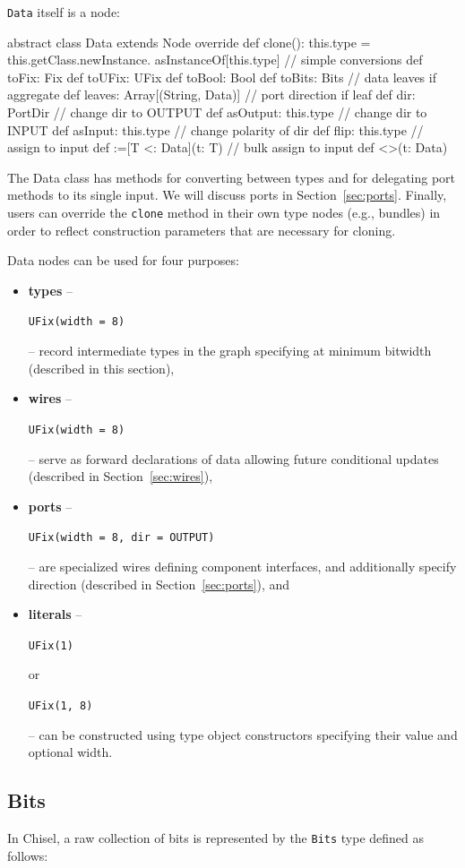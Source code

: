 \documentclass[10pt,twocolumn]{article}
\newcommand{\kode}[1]{\begin{footnotesize}{\tt #1}\end{footnotesize}}
\def\code#1{{\small\tt #1}}
\begin{document}
\code{Data} itself is a node:
\begin{scala}
abstract class Data extends Node {
  override def clone(): this.type =
    this.getClass.newInstance.
      asInstanceOf[this.type]
  // simple conversions
  def toFix: Fix
  def toUFix: UFix
  def toBool: Bool
  def toBits: Bits
  // data leaves if aggregate
  def leaves: Array[(String, Data)]
  // port direction if leaf
  def dir: PortDir
  // change dir to OUTPUT
  def asOutput: this.type
  // change dir to INPUT
  def asInput: this.type
  // change polarity of dir
  def flip: this.type
  // assign to input
  def :=[T <: Data](t: T)
  // bulk assign to input
  def <>(t: Data)
}
\end{scala}
\noindent
The Data class has methods for converting between types and for
delegating port methods to its single input.  We will discuss ports in
Section~\ref{sec:ports}.  Finally, users can override the \code{clone}
method in their own type nodes (e.g., bundles) in order to reflect
construction parameters that are necessary for cloning.

Data nodes can be used for four purposes:

\begin{itemize}
\item {\bf types} -- \kode{UFix(width = 8)} -- record intermediate types in the graph
  specifying at minimum bitwidth (described in this section), 
\item {\bf wires} -- \kode{UFix(width = 8)} -- serve as forward declarations of data allowing future
  conditional updates (described in Section~\ref{sec:wires}), 
\item {\bf ports} -- \kode{UFix(width = 8, dir = OUTPUT)} -- are
  specialized wires defining component interfaces, and
  additionally specify direction (described in
  Section~\ref{sec:ports}), and
\item{\bf literals} -- \kode{UFix(1)} or \kode{UFix(1, 8)} -- can be constructed using type object
constructors specifying their value and optional width.
\end{itemize}

\subsection{Bits}

In Chisel, a raw collection of bits is represented by the \code{Bits}
type defined as follows:
\end{document}
